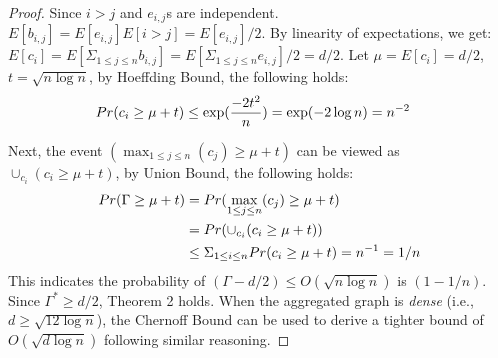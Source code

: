 \begin{proof}
Since $i>j$ and $e_{i,j}$s are independent. 
$E[b_{i,j}] = E[e_{i,j}]E[i>j]= E[e_{i,j}]/2$.
 By linearity 
of expectations,
we get: $E[c_i] = E[\Sigma_{1\leq j \leq n} b_{i,j}]=E[\Sigma_{1\leq j \leq n} e_{i,j}]/2 = d/2$.
 Let $\mu =E[c_i] = d/2$, 
$t = \sqrt{n\log n}$, by Hoeffding Bound, the following holds:
\vspace{-4mm}
\begin{equation*}
\vspace{-1mm}
\begin{split}
	Pr(c_i \geq \mu + t) &\leq \exp(\frac{-2t^2}{n}) = \exp(-2\log n) = n^{-2}
\end{split}
\end{equation*}

Next, the event $(\max_{1 \leq j \leq n}(c_j) \geq \mu + t)$ can be viewed as
$\cup_{c_i} (c_i \geq \mu + t )$, by Union Bound, the following holds:
\vspace{-1mm}
\begin{equation*}
\vspace{-1mm}
\begin{split}
	Pr(\Gamma \geq \mu + t) &=Pr(\max_{1\leq j \leq n}(c_j) \geq \mu + t)  \\
		& = Pr(\cup_{c_i} (c_i \geq \mu + t )) \\
		&\leq \Sigma_{1 \leq i \leq n} Pr(c_i \geq \mu + t) = n^{-1} = 1/n
\end{split}
\end{equation*}
This indicates the probability of $(\Gamma-d/2) \leq O(\sqrt{n\log n})$ is $(1-1/n)$. 
Since $\Gamma^* \geq d/2$, Theorem 2 holds.
When the aggregated graph is \emph{dense} (i.e., $d\geq \sqrt{12 \log n}$),
the Chernoff Bound can be used to derive a tighter bound of 
$O(\sqrt{d\log n}) $ following similar reasoning.
\end{proof}

